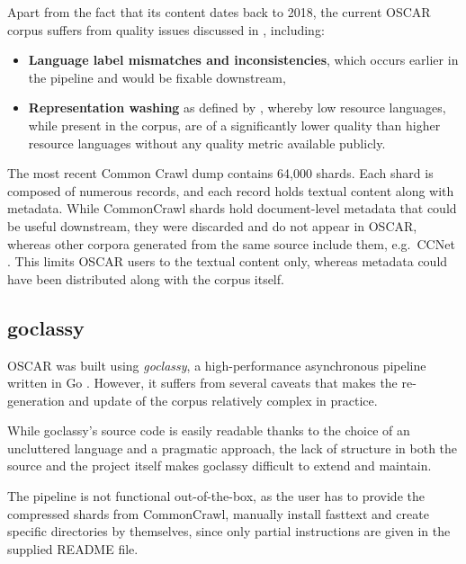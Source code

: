 Apart from the fact that its content dates back to 2018, the current OSCAR corpus suffers from quality issues discussed in \citep{caswell-etal-2020-language,caswell-etal-2021-quality}, including:

\begin{itemize}
    \item \textbf{Language label mismatches and inconsistencies}, which occurs earlier in the pipeline and would be fixable downstream,
    \item \textbf{Representation washing} as defined by \citet{caswell-etal-2021-quality}, whereby low resource languages, while present in the corpus, are of a significantly lower quality than higher resource languages without any quality metric available publicly.
\end{itemize}

The most recent Common Crawl dump contains 64,000 shards. Each shard is composed of numerous records, and each record holds textual content along with metadata. While CommonCrawl shards hold document-level metadata that could be useful downstream, they were discarded and do not appear in OSCAR, whereas other corpora generated from the same source include them, e.g.~CCNet \citep{wenzek-etal-2020-ccnet}. This limits OSCAR users to the textual content only, whereas metadata could have been distributed along with the corpus itself.

\subsection{goclassy}

OSCAR was built using \emph{goclassy}, a high-performance asynchronous pipeline written in Go \citep{ortiz-suarez-etal-2019-asynchronous}. However, it suffers from several caveats that makes the re-generation and update of the corpus relatively complex in practice.

While goclassy's source code is easily readable thanks to the choice of an uncluttered language and a pragmatic approach, the lack of structure in both the source and the project itself makes goclassy difficult to extend and maintain.

The pipeline is not functional out-of-the-box, as the user has to provide the compressed shards from CommonCrawl, manually install fasttext \citep{joulin-etal-2016-fasttext,joulin-etal-2017-bag} and create specific directories by themselves, since only partial instructions are given in the supplied README file.

